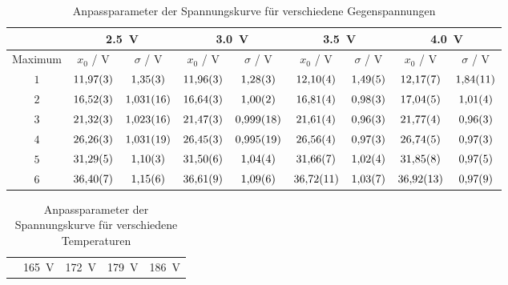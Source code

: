 \begin{table}[htbp]
   \centering
\caption{Anpassparameter der Spannungskurve für verschiedene Gegenspannungen}
\begin{tabular}{c|cc|cc|cc|cc}
\hline & \multicolumn{2}{|c}{\SI{2.5}{\volt}} & \multicolumn{2}{|c}{\SI{3.0}{\volt}} & \multicolumn{2}{|c}{\SI{3.5}{\volt}} & \multicolumn{2}{|c}{\SI{4.0}{\volt}}\\

\hline
Maximum & $x_0$ / \unit{\volt} & $\sigma$ / \unit{\volt} & $x_0$ / \unit{\volt} & $\sigma$ / \unit{\volt} & $x_0$ / \unit{\volt} & $\sigma$ / \unit{\volt} & $x_0$ / \unit{\volt} & $\sigma$ / \unit{\volt} \\ 
\hline
$\num{1}$ & $\num{11.97\pm 0.03}$ & $\num{1.35\pm 0.03}$ & $\num{11.96\pm 0.03}$ & $\num{1.28\pm 0.03}$ & $\num{12.10\pm 0.04}$ & $\num{1.49\pm 0.05}$ & $\num{12.17\pm 0.07}$ & $\num{1.84\pm 0.11}$ \\
$\num{2}$ & $\num{16.52\pm 0.03}$ & $\num{1.031\pm 0.016}$ & $\num{16.64\pm 0.03}$ & $\num{1.00\pm 0.02}$ & $\num{16.81\pm 0.04}$ & $\num{0.98\pm 0.03}$ & $\num{17.04\pm 0.05}$ & $\num{1.01\pm 0.04}$ \\
$\num{3}$ & $\num{21.32\pm 0.03}$ & $\num{1.023\pm 0.016}$ & $\num{21.47\pm 0.03}$ & $\num{0.999\pm 0.018}$ & $\num{21.61\pm 0.04}$ & $\num{0.96\pm 0.03}$ & $\num{21.77\pm 0.04}$ & $\num{0.96\pm 0.03}$ \\
$\num{4}$ & $\num{26.26\pm 0.03}$ & $\num{1.031\pm 0.019}$ & $\num{26.45\pm 0.03}$ & $\num{0.995\pm 0.019}$ & $\num{26.56\pm 0.04}$ & $\num{0.97\pm 0.03}$ & $\num{26.74\pm 0.05}$ & $\num{0.97\pm 0.03}$ \\
$\num{5}$ & $\num{31.29\pm 0.05}$ & $\num{1.10\pm 0.03}$ & $\num{31.50\pm 0.06}$ & $\num{1.04\pm 0.04}$ & $\num{31.66\pm 0.07}$ & $\num{1.02\pm 0.04}$ & $\num{31.85\pm 0.08}$ & $\num{0.97\pm 0.05}$ \\
$\num{6}$ & $\num{36.40\pm 0.07}$ & $\num{1.15\pm 0.06}$ & $\num{36.61\pm 0.09}$ & $\num{1.09\pm 0.06}$ & $\num{36.72\pm 0.11}$ & $\num{1.03\pm 0.07}$ & $\num{36.92\pm 0.13}$ & $\num{0.97\pm 0.09}$ \\
\hline\end{tabular}
\label{tab:gegenspannung}
\end{table}\begin{table}[htbp]
   \centering
\caption{Anpassparameter der Spannungskurve für verschiedene Temperaturen}
\begin{tabular}{c|cc|cc|cc|cc}
\hline & \multicolumn{2}{|c}{\SI{165}{\volt}} & \multicolumn{2}{|c}{\SI{172}{\volt}} & \multicolumn{2}{|c}{\SI{179}{\volt}} & \multicolumn{2}{|c}{\SI{186}{\volt}}\\


\end{tabular}
\end{table}
